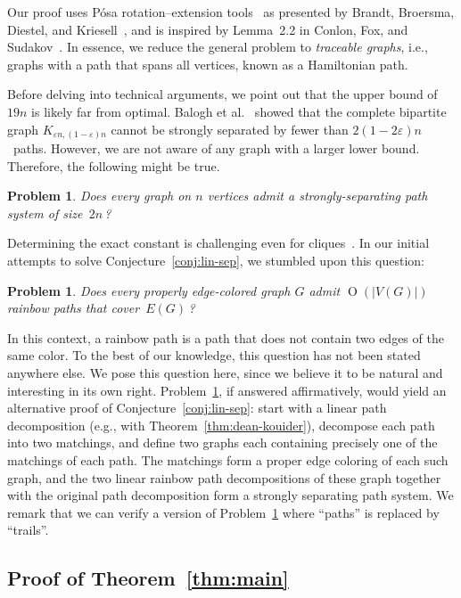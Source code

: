 \documentclass{aic}
\newcommand{\defi}[1]{\emph{#1}}
\DeclareMathOperator{\bigoh}{\mathrm{O}}
\newtheorem{problem}[theorem]{Problem}
\begin{document}
Our proof uses Pósa rotation--extension tools~\cite{posa1976hamiltonian}
as presented by Brandt, Broersma, Diestel, and Kriesell~\cite{brandt2006global},
and is inspired by  Lemma~2.2 in Conlon, Fox, and Sudakov~\cite{conlon2014cycle}.
In essence, we reduce the general problem to
\defi{traceable graphs}, i.e., graphs with a path that spans all vertices, known as a Hamiltonian path.

Before delving into technical arguments, we point out that the upper bound of $19n$ is likely far from optimal.
Balogh et al.~\cite[Theorem 10]{balogh2016path} showed that the complete bipartite graph \(K_{\varepsilon n,(1-\varepsilon)n}\)
cannot be strongly separated by fewer than \(2(1-2\varepsilon)n\)~paths.
However, we are not aware of any graph with a larger lower bound. Therefore, the following might be true.
\begin{problem}
  Does every graph on $n$ vertices admit a strongly-separating path system of size~$2n$\,?
\end{problem}
Determining the exact constant is challenging even for cliques~\cite{wickes}.
In our initial attempts to solve Conjecture~\ref{conj:lin-sep}, we stumbled upon this question:

\begin{problem}\label{prob:rainbow}
Does every properly edge-colored graph \(G\) admit
$\bigoh(|V(G)|)$ rainbow paths that cover~$E(G)$\,?
\end{problem}

In this context, a rainbow path is a path that does not contain two edges of the same color.
To the best of our knowledge, this question has not been stated anywhere else.
  We pose this question here, since we believe it to be natural and interesting in its own right.
Problem~\ref{prob:rainbow}, if answered affirmatively, would yield an alternative proof of Conjecture~\ref{conj:lin-sep}:
start with a linear path decomposition (e.g., with Theorem~\ref{thm:dean-kouider}),
decompose each path into two matchings, and define two graphs each containing precisely one of the matchings of each path.
The matchings form a proper edge coloring of each such graph,
and the two linear rainbow path decompositions of these graph together with the original path decomposition form a strongly separating path system.  We remark that we can verify a version of Problem~\ref{prob:rainbow}  where ``paths'' is replaced by ``trails''.




\subsection*{Proof of Theorem~\ref{thm:main}}
\end{document}
